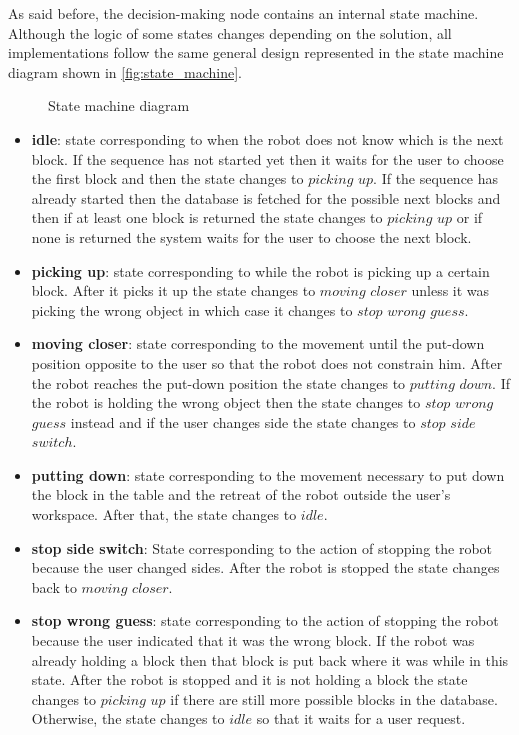 As said before, the decision-making node contains an internal state machine. Although the logic of some states changes depending on the solution, all implementations follow the same general design represented in the state machine diagram shown in \autoref{fig:state_machine}.
\begin{figure}[ht]
    \centering
    
    \caption{State machine diagram}
    \label{fig:state_machine}
\end{figure}
\begin{itemize}
    \item \textbf{idle}: state corresponding to when the robot does not know which is the next block. If the sequence has not started yet then it waits for the user to choose the first block and then the state changes to $picking$ $up$. If the sequence has already started then the database is fetched for the possible next blocks and then if at least one block is returned the state changes to $picking$ $up$ or if none is returned the system waits for the user to choose the next block.
    \item \textbf{picking up}: state corresponding to while the robot is picking up a certain block. After it picks it up the state changes to $moving$ $closer$ unless it was picking the wrong object in which case it changes to $stop$ $wrong$ $guess$.
    \item \textbf{moving closer}: state corresponding to the movement until the put-down position opposite to the user so that the robot does not constrain him. After the robot reaches the put-down position the state changes to $putting$ $down$. If the robot is holding the wrong object then the state changes to $stop$ $wrong$ $guess$ instead and if the user changes side the state changes to $stop$ $side$ $switch$.
    \item \textbf{putting down}: state corresponding to the movement necessary to put down the block in the table and the retreat of the robot outside the user's workspace. After that, the state changes to $idle$.
    \item \textbf{stop side switch}: State corresponding to the action of stopping the robot because the user changed sides. After the robot is stopped the state changes back to $moving$ $closer$.
    \item \textbf{stop wrong guess}: state corresponding to the action of stopping the robot because the user indicated that it was the wrong block. If the robot was already holding a block then that block is put back where it was while in this state. After the robot is stopped and it is not holding a block the state changes to $picking$ $up$ if there are still more possible blocks in the database. Otherwise, the state changes to $idle$ so that it waits for a user request.
\end{itemize}

